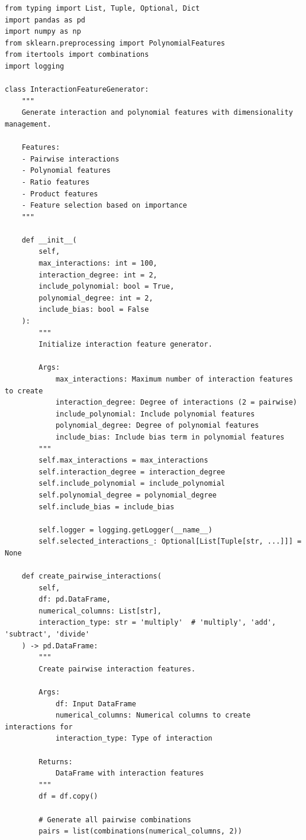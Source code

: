\begin{lstlisting}[style=python, caption={Intelligent Feature Interaction Generation}]
from typing import List, Tuple, Optional, Dict
import pandas as pd
import numpy as np
from sklearn.preprocessing import PolynomialFeatures
from itertools import combinations
import logging

class InteractionFeatureGenerator:
    """
    Generate interaction and polynomial features with dimensionality management.

    Features:
    - Pairwise interactions
    - Polynomial features
    - Ratio features
    - Product features
    - Feature selection based on importance
    """

    def __init__(
        self,
        max_interactions: int = 100,
        interaction_degree: int = 2,
        include_polynomial: bool = True,
        polynomial_degree: int = 2,
        include_bias: bool = False
    ):
        """
        Initialize interaction feature generator.

        Args:
            max_interactions: Maximum number of interaction features to create
            interaction_degree: Degree of interactions (2 = pairwise)
            include_polynomial: Include polynomial features
            polynomial_degree: Degree of polynomial features
            include_bias: Include bias term in polynomial features
        """
        self.max_interactions = max_interactions
        self.interaction_degree = interaction_degree
        self.include_polynomial = include_polynomial
        self.polynomial_degree = polynomial_degree
        self.include_bias = include_bias

        self.logger = logging.getLogger(__name__)
        self.selected_interactions_: Optional[List[Tuple[str, ...]]] = None

    def create_pairwise_interactions(
        self,
        df: pd.DataFrame,
        numerical_columns: List[str],
        interaction_type: str = 'multiply'  # 'multiply', 'add', 'subtract', 'divide'
    ) -> pd.DataFrame:
        """
        Create pairwise interaction features.

        Args:
            df: Input DataFrame
            numerical_columns: Numerical columns to create interactions for
            interaction_type: Type of interaction

        Returns:
            DataFrame with interaction features
        """
        df = df.copy()

        # Generate all pairwise combinations
        pairs = list(combinations(numerical_columns, 2))


\end{lstlisting}
